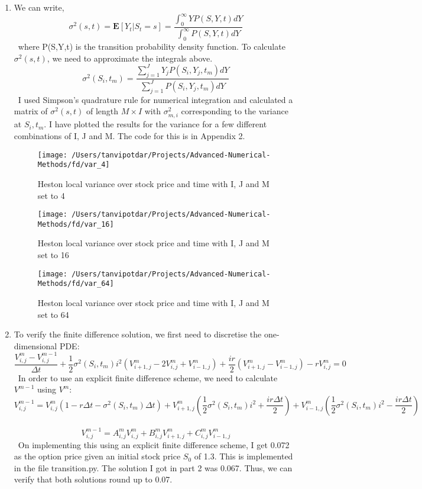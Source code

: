 \documentclass{article}
\begin{document}
\begin{enumerate}
\item We can write,
\[\sigma^2(s,t) = \mathbf{E}[Y_t|S_t=s] = \frac{\int^{\infty}_{0}YP(S,Y,t)dY}{\int^{\infty}_{0}P(S,Y,t)dY}\]\
where P(S,Y,t) is the transition probability density function. To calculate $\sigma^2(s,t)$, we need to approximate the integrals above. 
\[\sigma^2(S_i,t_m) =\frac{\sum_{j=1}^{J}Y_jP(S_i,Y_j,t_m)dY}{\sum_{j=1}^{J}P(S_i,Y_j,t_m)dY}\]\
I used Simpson's quadrature rule for numerical integration and calculated a matrix of $\sigma^2(s,t)$ of length $M \times I$ with $\sigma^2_{m,i}$ corresponding to the variance at $S_i, t_m$. I have plotted the results for the variance for a few different combinations of I, J and M. The code for this is in Appendix 2. 
\begin{figure}[!htbp]
    \centering
    \hspace*{-2cm}
    \texttt{[image: /Users/tanvipotdar/Projects/Advanced-Numerical-Methods/fd/var\_4]}
    \caption{Heston local variance over stock price and time with I, J and M set to 4}
\end{figure}

\begin{figure}[!htbp]
    \centering
    \vspace*{-0.2cm}
    \hspace*{-2cm}
    \texttt{[image: /Users/tanvipotdar/Projects/Advanced-Numerical-Methods/fd/var\_16]}
    \caption{Heston local variance over stock price and time with I, J and M set to 16}
\end{figure}

\begin{figure}[!htbp]
    \centering
    \vspace*{-0.7cm}
    \hspace*{-2cm}
    \texttt{[image: /Users/tanvipotdar/Projects/Advanced-Numerical-Methods/fd/var\_64]}
    \caption{Heston local variance over stock price and time with I, J and M set to 64}
\end{figure}

\item To verify the finite difference solution, we first need to discretise the one-dimensional PDE:
\[\frac{V^{m}_{i,j}-V^{m-1}_{i,j}}{\Delta{t}} + \frac{1}{2}\sigma^2(S_i,t_m)i^2(V^m_{i+1,j} -2V^m_{i,j}+V^m_{i-1,j}) + \frac{ir}{2} (V^m_{i+1,j} - V^m_{i-1,j}) -rV^m_{i,j}=0\]\
In order to use an explicit finite difference scheme, we need to calculate $V^{m-1}$ using $V^m$:
\[V^{m-1}_{i,j} = V^{m}_{i,j}(1-r\Delta{t}-\sigma^2(S_i,t_m)\Delta{t}) + V^m_{i+1,j}(\frac{1}{2}\sigma^2(S_i,t_m)i^2 + \frac{ir\Delta{t}}{2}) + V^m_{i-1,j}(\frac{1}{2}\sigma^2(S_i,t_m)i^2 - \frac{ir\Delta{t}}{2})\]\
\[V^{m-1}_{i,j} = A^m_{i,j}V^{m}_{i,j} + B^m_{i,j}V^m_{i+1,j}+ C^m_{i,j}V^m_{i-1,j}\]\
On implementing this using an explicit finite difference scheme, I get 0.072 as the option price given an initial stock price $S_0$ of 1.3. This is implemented in the file transition.py. The solution I got in part 2 was 0.067. Thus, we can verify that both solutions round up to 0.07.
\end{enumerate}
\newpage
\end{document}
